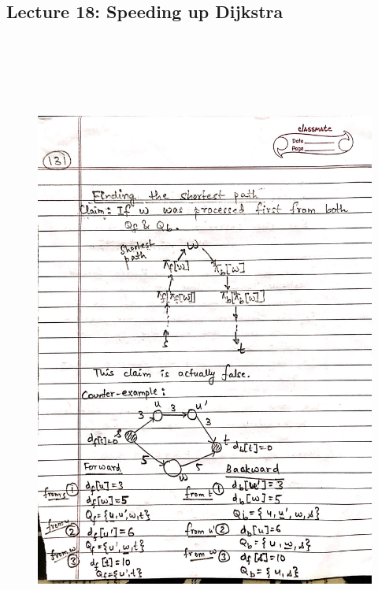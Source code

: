 \newpage
{\color{black} \subsection*{Lecture 18: Speeding up Dijkstra}}
\begin{figure}[H]
    \centering
    \includegraphics[width=16cm, height=21cm]{"./MIT-6.006/MIT-6006-131"}
\end{figure}

